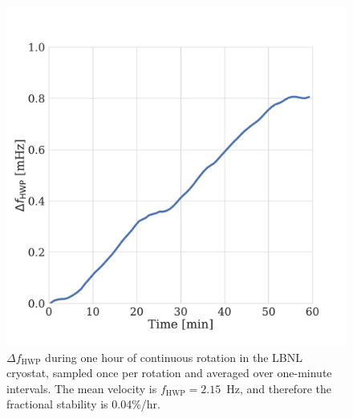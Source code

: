 \begin{figure}[!t]
    \centering
    \includegraphics[width=0.6\linewidth, trim=0.5cm 1.4cm 2.5cm 3cm, clip]{CHWPEvaluation/Figures/velocity.pdf}
    \caption{$\Delta f_{\mathrm{HWP}}$ during one hour of continuous rotation in the LBNL cryostat, sampled once per rotation and averaged over one-minute intervals. The mean velocity is $f_{\mathrm{HWP}} = 2.15$~Hz, and therefore the fractional stability is 0.04\%/hr.}
    \label{fig:rot_stability}
\end{figure}

